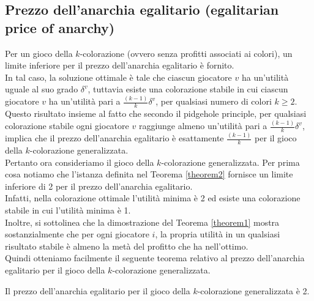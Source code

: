 \subsection{Prezzo dell'anarchia egalitario (egalitarian price of anarchy)}
\justify
Per un gioco della \(k\)-colorazione (ovvero senza profitti associati ai colori), un limite inferiore per il prezzo dell'anarchia egalitario è fornito.\\

In tal caso, la soluzione ottimale è tale che ciascun giocatore \(v\) ha un'utilità uguale al suo grado \(\delta^v\), tuttavia esiste una colorazione stabile in cui ciascun giocatore \(v\) ha un'utilità pari a \(\frac{(k-1)}{k} \delta^v\), per qualsiasi numero di colori \(k \geq 2\).\\

Questo risultato insieme al fatto che secondo il pidgehole principle, per qualsiasi colorazione stabile ogni giocatore \(v\) raggiunge almeno un'utilità pari a \(\frac{(k-1)}{k} \delta^v\), implica che il prezzo dell'anarchia egalitario è esattamente \(\frac{(k-1)}{k}\) per il gioco della \(k\)-colorazione generalizzata.\\

Pertanto ora consideriamo il gioco della \(k\)-colorazione generalizzata. Per prima cosa notiamo che l'istanza definita nel Teorema \ref{theorem2} fornisce un limite inferiore di 2 per il prezzo dell'anarchia egalitario.\\

Infatti, nella colorazione ottimale l'utilità minima è 2 ed esiste una colorazione stabile in cui l'utilità minima è 1.\\

Inoltre, si sottolinea che la dimostrazione del Teorema \ref{theorem1} mostra sostanzialmente che per ogni giocatore \(i\), la propria utilità in un qualsiasi risultato stabile è almeno la metà del profitto che ha nell'ottimo.\\

Quindi otteniamo facilmente il seguente teorema relativo al prezzo dell'anarchia egalitario per il gioco della \(k\)-colorazione generalizzata.

\begin{theorem}
\label{theorem3}
	Il prezzo dell'anarchia egalitario per il gioco della \(k\)-colorazione generalizzata è 2.
\end{theorem}